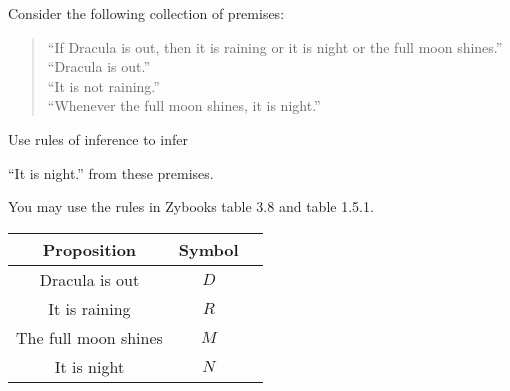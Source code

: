 \documentclass[11pt]{article}
\def\sectionOneA#1{}
\def\sectionOneB#1{}
\def\sectionTwoA#1{}
\def\sectionTwoB#1{}
\def\sectionVicsection#1{#1}
\begin{document}
Consider the following collection of premises:
\begin{quote}
\sectionOneA{
``I am smart or I am lucky.''\\
``I am not smart.''\\
  ``If I am lucky then I will win the lottery.''}
\sectionOneB{ %
``I am smart or I am lucky.''\\
``I am not smart.''\\
  ``If I am lucky then I will win the lottery.''}
\sectionTwoA{
``I am lucky then I will win the lottery.''\\
``If I win the lottery then I am smart.''\\
  ``I am not smart.''}
\sectionTwoB{ %
``I am lucky then I will win the lottery.''\\
``If I win the lottery then I am smart.''\\
  ``I am not smart.''}
\sectionVicsection{
``If Dracula is out, then it is raining or it is night or the full moon shines.''\\
``Dracula is out.''\\
``It is not raining.''\\
``Whenever the full moon shines, it is night.''}
\end{quote}
Use rules of inference to infer
\sectionOneA{``I will win the lottery.''}
\sectionOneB{``I will win the lottery.''} %
\sectionTwoA{``I am not lucky.''}
\sectionTwoB{``I am not lucky.''} %
\sectionVicsection{``It is night.''}
from these premises. 

You may use the rules in Zybooks table 3.8 and table 1.5.1.


\begin{center}
    {\Large
\begin{tabular}{|c|c|c|}
    Proposition & Symbol
    &\hspace*{7cm}\\\hline
    Dracula is out & $D$ &\\
    It is raining & $R$ & \\
    The full moon shines & $M$ & \\
    It is night & $N$ &
\end{tabular} }
\end{center}
\end{document}
